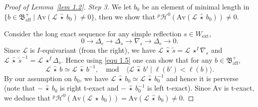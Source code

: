 \documentclass[11pt]{amsart}
\numberwithin{equation}{section}
\theoremstyle{plain}
\theoremstyle{definition}
\newcommand{\sH}{{\mathcal H}}
\newcommand{\sL}{{\mathcal L}}
\newcommand{\Av}{\mathrm{Av}}
\newcommand{\ex}{\mathrm{ext}}
\newcommand{\af}{\mathrm{aff}}
\begin{document}
\begin{proof}[Proof of Lemma~\ref{lem 1.2}]
\textit{Step 3.} 
We let $b_0$ be an element of minimal length in $\{b\in \mathfrak{B}^+_\af \mid \Av(\sL\ \widehat{\star}\ b_0)\neq 0\}$, then we show that ${}^p\sH^0(\Av(\sL\ \widehat{\star}\ b_0))\neq 0$. 

Consider the long exact sequence for any simple reflection $s\in W_\ex$, 
\begin{equation}\label{equ 1.5}
0\rightarrow \Delta_e \rightarrow \Delta_s \rightarrow \nabla_s \rightarrow \Delta_e \rightarrow 0. 
\end{equation}
Since $\sL$ is $I$-equivariant (from the right), we have $\sL \ \widehat{\star}\ \widetilde{s}= \sL\ {\star^I} \nabla_s$ and $\sL \ \widehat{\star}\ \widetilde{s}^{-1}= \sL\ {\star^I} \Delta_s$. 
Hence using \eqref{equ 1.5} one can show that for any $b\in \mathfrak{B}_\af^+$, 
\[
\sL\ \widehat{\star}\ b \simeq \sL\ \widehat{\star}\ b^{-1}, \quad \text{mod}\quad \langle \sL\ \widehat{\star}\ b'\mid \ell(b')<\ell(b)\rangle.
\]
By our assumption on $b_0$, we have $\sL\ \widehat{\star}\ b_0 \simeq \sL\ \widehat{\star}\ b_0^{-1}$ and hence it is perverse (note that $-\ \widehat{\star}\ b_0$ is right t-exact and $-\ \widehat{\star}\ b_0^{-1}$ is left t-exact). 
Since $\Av$ is t-exact, we deduce that ${}^p\sH^0(\Av(\sL\ \widehat{\star}\ b_0))=\Av(\sL\ \widehat{\star}\ b_0)\neq 0$. 
\end{proof}
\fi

 

\end{document}
